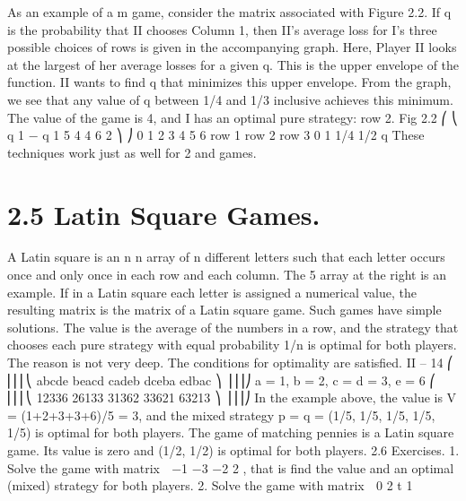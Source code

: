 \documentclass[]{report}
\begin{document}
As an example of a m  game, consider the matrix associated with Figure 2.2. If
q is the probability that II chooses Column 1, then II’s average loss for I’s three possible
choices of rows is given in the accompanying graph. Here, Player II looks at the largest
of her average losses for a given q. This is the upper envelope of the function. II wants
to find q that minimizes this upper envelope. From the graph, we see that any value of q
between 1/4 and 1/3 inclusive achieves this minimum. The value of the game is 4, and I
has an optimal pure strategy: row 2.
Fig 2.2
⎛
⎝
q 1 − q
1 5
4 4
6 2
⎞
⎠
0
1
2
3
4
5
6
row 1
row 2
row 3
0 1 1/4 1/2
q
These techniques work just as well for 2 \times \infty and \infty {} games.

\section{2.5 Latin Square Games.} A Latin square is an n \times n array of n different letters
such that each letter occurs once and only once in each row and each column. The 5 
array at the right is an example. If in a Latin square each letter is assigned a numerical
value, the resulting matrix is the matrix of a Latin square game. Such games have simple
solutions. The value is the average of the numbers in a row, and the strategy that chooses
each pure strategy with equal probability 1/n is optimal for both players. The reason is
not very deep. The conditions for optimality are satisfied.
II – 14
⎛
⎜⎜⎜⎝
abcde
beacd
cadeb
dceba
edbac
⎞
⎟⎟⎟⎠
a = 1, b = 2, c = d = 3, e = 6
⎛
⎜⎜⎜⎝
12336
26133
31362
33621
63213
⎞
⎟⎟⎟⎠
In the example above, the value is V = (1+2+3+3+6)/5 = 3, and the mixed strategy
p = q = (1/5, 1/5, 1/5, 1/5, 1/5) is optimal for both players. The game of matching pennies
is a Latin square game. Its value is zero and (1/2, 1/2) is optimal for both players.
2.6 Exercises.
1. Solve the game with matrix  −1 −3
−2 2
, that is find the value and an optimal
(mixed) strategy for both players.
2. Solve the game with matrix  0 2
t 1
\end{document}
